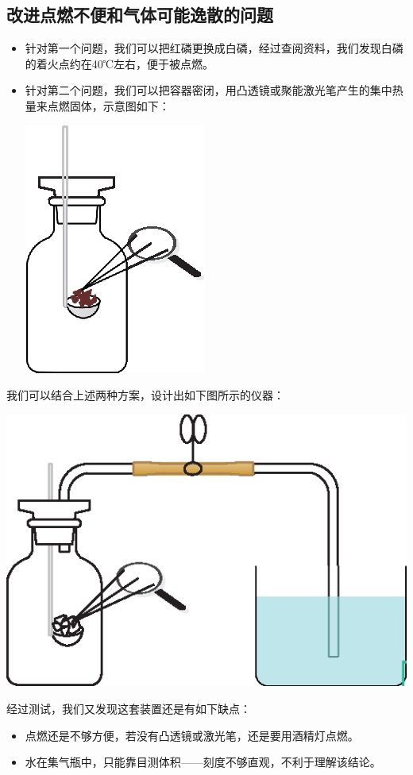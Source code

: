 \documentclass[11pt,a4paper,titlepage]{ctexart}
\begin{document}
	\subsection{改进点燃不便和气体可能逸散的问题}
	\begin{itemize}
		\item 针对第一个问题，我们可以把红磷更换成白磷，经过查阅资料，我们发现白磷的着火点约在40℃左右，便于被点燃。
		\item 针对第二个问题，我们可以把容器密闭，用凸透镜或聚能激光笔产生的集中热量来点燃固体，示意图如下：\\
		\begin{center}
			\includegraphics[width=0.3\linewidth]{fig/2}
		\end{center}
		
	\end{itemize}
	
	我们可以结合上述两种方案，设计出如下图所示的仪器：
	
	\begin{center}
		\includegraphics[width=0.5\linewidth]{fig/3}
	\end{center}
	

	经过测试，我们又发现这套装置还是有如下缺点：
	
	\begin{itemize}
		\item 点燃还是不够方便，若没有凸透镜或激光笔，还是要用酒精灯点燃。
		\item 水在集气瓶中，只能靠目测体积——刻度不够直观，不利于理解该结论。
	\end{itemize}
	
\end{document}
